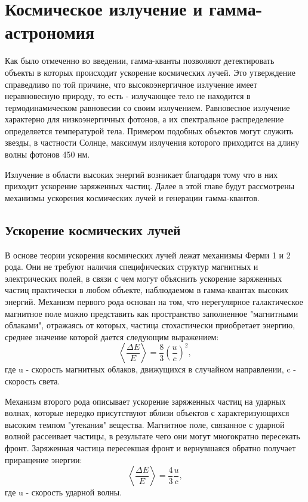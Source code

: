 \chapter{Космическое излучение и гамма-астрономия}\label{ch:ch1}
Как было отмеченно во введении, гамма-кванты позволяют детектировать объекты в которых происходит ускорение космических лучей. Это утверждение справедливо по той причине, что высокоэнергичное излучение имеет неравновесную природу, то есть - излучающее тело не находится в термодинамическом равновесии со своим излучением. Равновесное излучение характерно для низкоэнергичных фотонов, а их спектральное распределение определяется температурой тела. Примером подобных объектов могут служить звезды, в частности Солнце, максимум  излучения которого приходится на длину волны фотонов 450 нм.

Излучение в области высоких энергий возникает благодаря тому что в них приходит ускорение заряженных частиц. Далее в этой главе будут рассмотрены механизмы ускорения космических лучей и генерации гамма-квантов.

\section{Ускорение космических лучей}\label{sec:ch1/sec1}
В основе теории ускорения космических лучей лежат механизмы Ферми 1 и 2 рода. Они не требуют наличия специфических структур магнитных и электрических полей, в связи с чем могут объяснить ускорение заряженных частиц практически в любом объекте, наблюдаемом в гамма-квантах высоких энергий.
Механизм первого рода основан на том, что нерегулярное галактическое магнитное поле можно представить как пространство заполненное "магнитными облаками", отражаясь от которых, частица стохастически приобретает энергию, среднее значение которой дается следующим выражением: 
$$\left \langle\frac{\Delta E}{E}\right \rangle = \frac{8}{3}\left(\frac{u}{c}\right )^2,$$
где u - скорость магнитных облаков, движущихся в случайном направлении, c - скорость света.

Механизм второго рода описывает ускорение заряженных частиц на ударных волнах, которые нередко присутствуют вблизи объектов с характеризующихся высоким темпом "утекания" вещества. Магнитное поле, связанное с ударной волной рассеивает частицы, в результате чего они могут многократно пересекать фронт. Заряженная частица пересекшая фронт и вернувшаяся обратно получает приращение энергии:
$$\left \langle\frac{\Delta E}{E}\right \rangle = \frac{4}{3}\frac{u}{c},$$
где u - скорость ударной волны.


